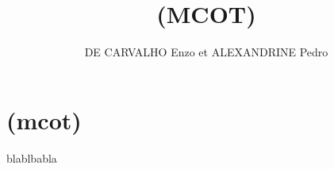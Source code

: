 \documentclass[a4paper,11pt]{article}
\date{}
\title{(MCOT)}
\author{DE CARVALHO Enzo et ALEXANDRINE Pedro}
\begin{document}
\maketitle
\section{(mcot)}
\cite{Cvdfr}
blablbabla
\cite{fbprophet}

 
\end{document}
